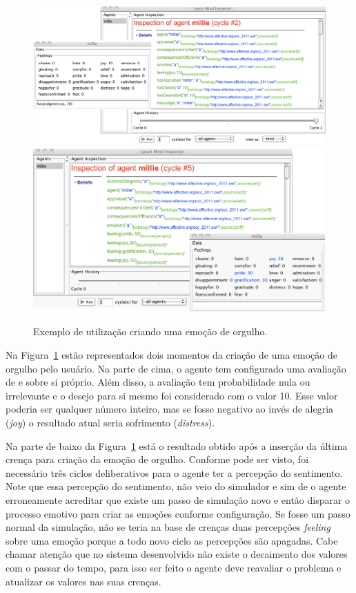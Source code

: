 \begin{figure}
	\begin{center}
		\includegraphics[width=150mm]{figuras/beforeLastInsertionOfPride.png}
		\includegraphics[width=150mm]{figuras/afterLastInsertionOfPride.png}
	\end{center}
	\caption{Exemplo de utilização criando uma emoção de orgulho.}
	\label{fig:testeJasonIntBase}
\end{figure}

Na Figura~\ref{fig:testeJasonIntBase} estão representados dois momentos da
criação de uma emoção de orgulho pelo usuário. Na parte de cima, o
agente tem configurado uma avaliação de e sobre si próprio. Além disso, a
avaliação tem probabilidade nula ou irrelevante e o desejo para si mesmo foi
considerado com o valor 10. Esse valor poderia ser qualquer número inteiro,
mas se fosse negativo ao invés de alegria (\emph{joy}) o resultado atual seria
sofrimento (\emph{distress}).

Na parte de baixo da Figura~\ref{fig:testeJasonIntBase} está o resultado
obtido após a inserção da última crença para criação da emoção de orgulho.
Conforme pode ser visto, foi necessário três ciclos deliberativos para o
agente ter a percepção do sentimento. Note que essa percepção do sentimento,
não veio do simulador e sim de o agente erroneamente acreditar que existe um
passo de simulação novo e então disparar o processo emotivo para criar as emoções
conforme configuração. Se fosse um passo normal da simulação, não se
teria na base de crenças duas percepções \emph{feeling} sobre uma emoção
porque a todo novo ciclo as percepções são apagadas. Cabe chamar atenção que
no sistema desenvolvido não existe o decaimento dos valores com o
passar do tempo, para isso ser feito o agente deve reavaliar o problema e
atualizar os valores nas suas crenças.

